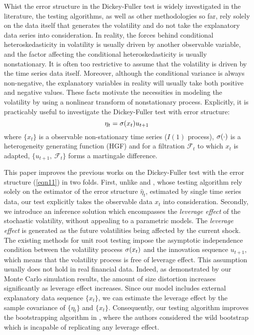 Whist the error structure  in the Dickey-Fuller test is widely investigated in the literature, the testing algorithms, as well as other methodologies so far,  rely solely on the  data itself that generates the volatility  and do not  take the explanatory data series into consideration. In reality, the forces behind conditional heteroskedasticity in volatility is usually driven by another observable variable, and the factor affecting the conditional heteroskedasticity is usually nonstationary. It is often too restrictive to assume that the volatility  is driven by the time series data itself. Moreover, although the conditional variance is always non-negative, the explanatory variables in reality will usually take both positive and negative values. These facts motivate the necessities in  modeling the volatility by using a nonlinear transform of nonstationary process. Explicitly, it is practicably useful to investigate  the Dickey-Fuller
 test with  error structure:
\begin{equation} \la{eqn11}
\eta_{t} = \si (x_{t}) u_{t+1}
\end{equation}
where $\{x_{t}\}$ is a observable  non-stationary time series ($I(1)$ process), $\sigma(\cdot)$ is  a heterogeneity generating
function (HGF) and for a filtration $\mathcal{F}_{t}$ to which $x_{t}$
is adapted, $\{u_{t+1},\ {\mathcal{F}_{t}}\}$ forms a martingale
difference.

This paper improves the previous works on the Dickey-Fuller test with the error structure (\ref {eqn11}) in two folds. First,
unlike  \cite{boswijk2005} and \cite{cavalieretaylor2009}, whose testing algorithm rely solely on the estimator of the error structure $\widehat{\eta}_{t}$, estimated by single time series data, our test explicitly takes the observable data $x_{t}$ into consideration.
Secondly, we introduce an inference solution which encompasses the \textit{leverage effect} of the stochastic volatility, without appealing to a parametric models. The \textit{leverage effect} is generated as the future volatilities being affected by the current shock. The existing methods for unit root testing  impose the asymptotic independence condition between the  volatility process $\sigma(x_{t})$ and the innovation sequence $u_{t+1}$, which means that the volatility process is free of leverage effect. This assumption usually does not hold in real  financial data. Indeed, as demonstrated by our Monte Carlo simulation results, the amount of size distortion increases significantly as leverage effect increases.
Since our model includes external explanatory data sequence $\{x_{t}\}$, we can estimate the leverage effect by the sample covariance of $\{ \eta_{t}\}$ and $\{ x_{t}\}$. Consequently, our testing algorithm improves the bootstrapping algorithm in \cite{cavalieretaylor2009}, where the authors considered the wild bootstrap which is incapable of replicating any leverage effect.


